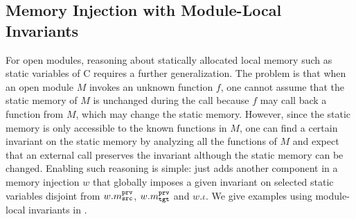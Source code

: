 {





\subsection{Memory Injection with Module-Local Invariants}
\label{sec:overview-verification:injection:static}
%
For open modules, reasoning about statically allocated local memory
such as static variables of C requires a further generalization.  The
problem is that when an open module $M$ invokes an unknown function
$f$, one cannot assume that the static memory of $M$ is unchanged
during the call because $f$ may call back a function from $M$, which
may change the static memory. However, since the static memory is only
accessible to the known functions in $M$, one can find a certain
invariant on the static memory by analyzing all the functions of $M$
and expect that an external call preserves the invariant although the
static memory can be changed. Enabling such reasoning is simple:
\ccm{} just adds another component in a memory injection $w$ that
globally imposes a given invariant on selected static variables
disjoint from $w.m^{\texttt{prv}}_{\texttt{src}}$, $w.m^{\texttt{prv}}_{\texttt{tgt}}$ and $w.\iota$.
We give examples using module-local invariants in .
} %

